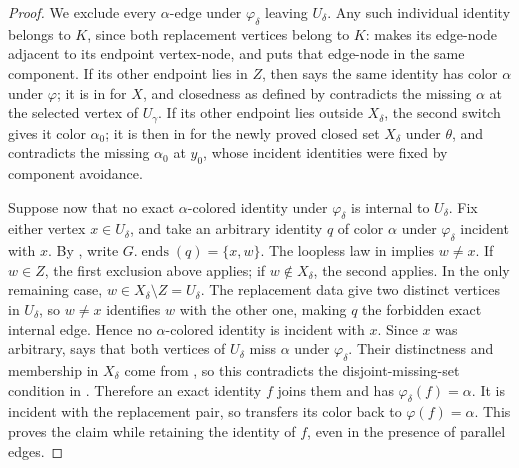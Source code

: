 \begin{proof}
We exclude every $\alpha$-edge under $\varphi_\delta$ leaving $U_\delta$.
Any such individual identity belongs to $K$, since both replacement vertices
belong to $K$:  makes its edge-node adjacent
to its endpoint vertex-node, and  puts that
edge-node in the same component.  If its other endpoint lies in $Z$, then
 says the same identity has color
$\alpha$ under $\varphi$; it is in  for $X$, and
closedness as defined by  contradicts the
missing $\alpha$ at the selected vertex of $U_\gamma$.  If
its other endpoint lies outside $X_\delta$, the second switch gives it color
$\alpha_0$; it is then in  for the newly proved
closed set $X_\delta$ under $\theta$, and
 contradicts the missing $\alpha_0$ at
$y_0$, whose incident identities were fixed by component avoidance.

Suppose now that no exact $\alpha$-colored identity under
$\varphi_\delta$ is internal to $U_\delta$.  Fix either vertex
$x\in U_\delta$, and take an arbitrary identity $q$ of color $\alpha$
under $\varphi_\delta$ incident with $x$.  By , write
$G.\operatorname{ends}(q)=\{x,w\}$.  The loopless law in
 implies $w\ne x$.  If $w\in Z$, the first
exclusion above applies; if $w\notin X_\delta$, the second applies.  In the
only remaining case, $w\in X_\delta\setminus Z=U_\delta$.  The replacement
data give two distinct vertices in $U_\delta$, so $w\ne x$ identifies $w$
with the other one, making $q$ the forbidden exact internal edge.  Hence no
$\alpha$-colored identity is incident with $x$.  Since $x$ was arbitrary,
 says that both vertices of $U_\delta$ miss
$\alpha$ under $\varphi_\delta$.  Their distinctness and membership in
$X_\delta$ come from , so this contradicts
the disjoint-missing-set condition in
.  Therefore an exact identity $f$
joins them and has $\varphi_\delta(f)=\alpha$.  It is incident with the
replacement pair, so
 transfers its color back to
$\varphi(f)=\alpha$.  This proves the claim while retaining the identity of
$f$, even in the presence of parallel edges.
\end{proof}
